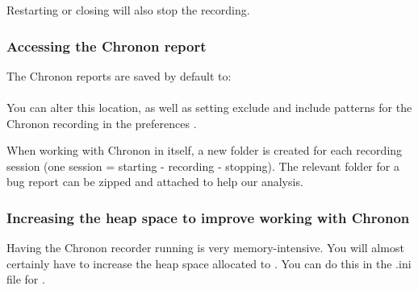 Restarting or closing \app{} will also stop the recording. 

\subsubsection{Accessing the Chronon report}
The Chronon reports are saved by default to:\\
\\

You can alter this location, as well as setting exclude and include patterns for the Chronon recording in the preferences . 

When working with Chronon in \app{} itself, a new folder is created for each recording session (one session = starting - recording - stopping). The relevant folder for a bug report can be zipped and attached to help our analysis. 


\subsubsection{Increasing the heap space to improve working with Chronon}
Having the Chronon recorder running is very memory-intensive. You will almost certainly have to increase the heap space allocated to \app{}. You can do this in the .ini file for \app{}. 



